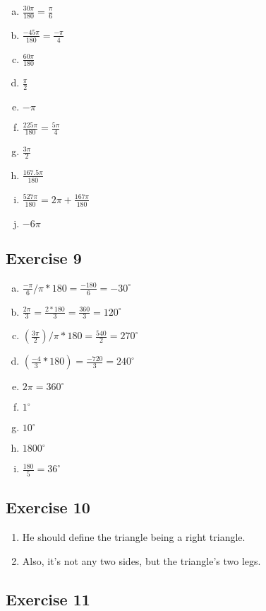 \documentclass[11pt]{article}
\begin{document}
\begin{enumerate}[a.]
\item $\frac{30 \pi}{180}=\frac{\pi}{6}$
\item $\frac{-45\pi}{180}=\frac{-\pi}{4}$
\item $\frac{60\pi}{180}$
\item $\frac{\pi}{2}$
\item $-\pi$
\item $\frac{225\pi}{180}=\frac{5\pi}{4}$
\item $\frac{3\pi}{2}$
\item $\frac{167.5\pi}{180}$
\item $\frac{527\pi}{180}=2\pi+\frac{167\pi}{180}$
\item $-6\pi$
\end{enumerate}

\subsection{Exercise 9}

\begin{enumerate}[a.]
\item $\frac{-\pi}{6}/\pi*180=\frac{-180}{6}=-30^\circ$
\item $\frac{2\pi}{3}=\frac{2*180}{3}=\frac{360}{3}=120^\circ$ 
\item $(\frac{3\pi}{2})/\pi*180=\frac{540}{2}=270^\circ$ 
\item $(\frac{-4}{3}*180)=\frac{-720}{3}=240^\circ$ 
\item $2\pi=360^\circ$
\item $1^\circ$
\item $10^\circ$
\item $1800^\circ$
\item $\frac{180}{5}=36^\circ$
\end{enumerate}

\subsection{Exercise 10}

\begin{enumerate}[1.]
\item He should define the triangle being a right triangle.
\item Also, it's not any two sides, but the triangle's two legs.
\end{enumerate}

\subsection{Exercise 11}
\end{document}
